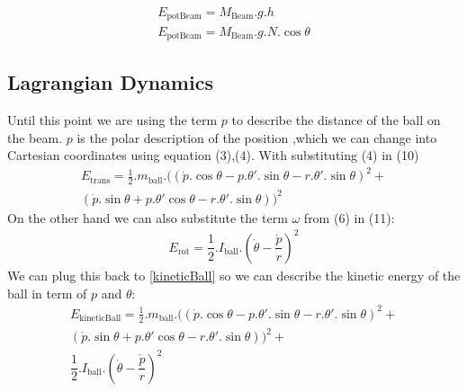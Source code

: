 \documentclass{article}
\begin{document}
\begin{equation}
	\begin{split}
		E_{\text{potBeam}} = M_{\text{Beam}}.g.h \\
		E_{\text{potBeam}} = M_{\text{Beam}}.g.N.\cos{\theta}
	\end{split}
\end{equation}

\subsection{Lagrangian Dynamics}
Until this point we are using the term $p$ to describe the distance of the ball on the beam.
$p$ is the polar description of the position ,which we can change into Cartesian coordinates using equation (3),(4).
With substituting (4) in (10)
\begin{equation}\label{velocity}
	\begin{split}
		E_{\text{trans}} = \frac{1}{2}.m_{\text{ball}}.((\dot{p}.\cos{\theta}-p.\theta'.\sin{\theta} - r.\theta'.\sin{\theta})^2 + \\
		(\dot{p}.\sin{\theta}+ p.\theta'\cos{\theta} - r.\theta'.\sin{\theta}) )^2
	\end{split}
\end{equation}
On the other hand we can also substitute the term $\omega$ from (6) in (11):
\begin{equation}
	\begin{split}
		E_{\text{rot}} = \dfrac{1}{2}.I_{\text{ball}}.(\dot{\theta} - \dfrac{\dot{p}}{r})^2
	\end{split}
\end{equation}
We can plug this back to \ref{kineticBall} so we can describe the kinetic energy of the ball in term of $p$ and $\theta$:
\begin{equation}
	\begin{aligned}
		E_{\text{kineticBall}} = \frac{1}{2}.m_{\text{ball}}.((\dot{p}.\cos{\theta}-p.\theta'.\sin{\theta} - r.\theta'.\sin{\theta})^2 + \\
		(\dot{p}.\sin{\theta}+ p.\theta'\cos{\theta} - r.\theta'.\sin{\theta}) )^2 + \\
		\dfrac{1}{2}.I_{\text{ball}}.(\dot{\theta} - \dfrac{\dot{p}}{r})^2
	\end{aligned}
\end{equation}
\end{document}
